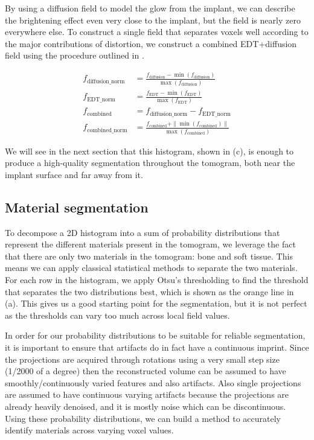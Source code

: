 By using a diffusion field to model the glow from the implant, we can describe
the brightening effect even very close to the implant, but the field is nearly
zero everywhere else. To construct a single field that separates voxels well
according to the major contributions of distortion, we construct a combined
EDT+diffusion field using the procedure outlined in .

\begin{equation}
    \label{eq:field-comb}
    \begin{split}
        f_{\text{diffusion\_norm}} &= \frac{f_{\text{diffusion}} - \min (f_{\text{diffusion}})}{\max (f_{\text{diffusion}})} \\
        f_{\text{EDT\_norm}} &= \frac{f_{\text{EDT}} - \min (f_{\text{EDT}})}{\max (f_{\text{EDT}})} \\
        f_{\text{combined}} &= f_{\text{diffusion\_norm}} - f_{\text{EDT\_norm}} \\
        f_{\text{combined\_norm}} &= \frac{f_{\text{combined}} + \|\min (f_{\text{combined}})\|}{\max (f_{\text{combined}})}
    \end{split}
\end{equation}

We will see in the next section that this histogram, shown in
(c), is enough to produce a high-quality segmentation
throughout the tomogram, both near the implant surface and far away from it.

\subsection{Material segmentation}

To decompose a 2D histogram into a sum of probability distributions that
represent the different materials present in the tomogram, we leverage the fact
that there are only two materials in the tomogram: bone and soft tissue. This
means we can apply classical statistical methods to separate the two materials.
For each row in the histogram, we apply Otsu's thresholding to find the
threshold that separates the two distributions best, which is shown as the
orange line in (a). This gives us a good starting point for the
segmentation, but it is not perfect as the thresholds can vary too much across
local field values.

In order for our probability distributions to be suitable for reliable
segmentation,  it is important to ensure that artifacts do in fact have a
continuous imprint.  Since the projections are acquired through rotations using
a very small step size (1/2000 of a degree) then the reconstructed volume can
be assumed to have smoothly/continuously varied features and also artifacts.
Also single projections are assumed to have continuous varying artifacts
because the projections are already heavily denoised, and it is mostly noise
which can be discontinuous. Using these probability distributions, we can build
a method to accurately identify materials across varying voxel values.

